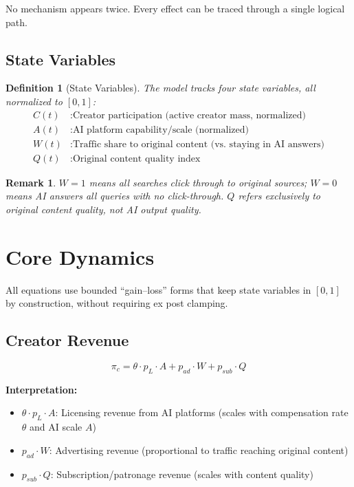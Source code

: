 \documentclass[11pt,a4paper]{article}
\newtheorem{definition}{Definition}
\newtheorem{remark}{Remark}
\begin{document}
No mechanism appears twice. Every effect can be traced through a single logical path.

\subsection{State Variables}

\begin{definition}[State Variables]
The model tracks four state variables, all normalized to $[0,1]$:
\begin{align}
C(t) &: \text{Creator participation (active creator mass, normalized)} \\
A(t) &: \text{AI platform capability/scale (normalized)} \\
W(t) &: \text{Traffic share to original content (vs.\ staying in AI answers)} \\
Q(t) &: \text{Original content quality index}
\end{align}
\end{definition}

\begin{remark}
$W = 1$ means all searches click through to original sources; $W = 0$ means AI answers all queries with no click-through. $Q$ refers exclusively to \emph{original} content quality, not AI output quality.
\end{remark}

\section{Core Dynamics}

All equations use bounded ``gain--loss'' forms that keep state variables in $[0,1]$ by construction, without requiring ex post clamping.

\subsection{Creator Revenue}

\begin{equation}
\boxed{
\pi_c = \theta \cdot p_L \cdot A + p_{ad} \cdot W + p_{sub} \cdot Q
}
\end{equation}

\textbf{Interpretation:}
\begin{itemize}
    \item $\theta \cdot p_L \cdot A$: Licensing revenue from AI platforms (scales with compensation rate $\theta$ and AI scale $A$)
    \item $p_{ad} \cdot W$: Advertising revenue (proportional to traffic reaching original content)
    \item $p_{sub} \cdot Q$: Subscription/patronage revenue (scales with content quality)
\end{itemize}
\end{document}
